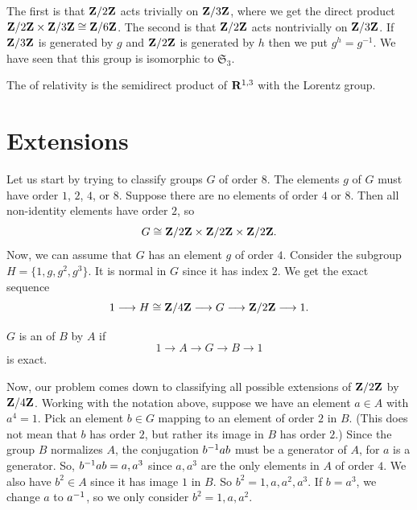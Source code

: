 \documentclass[11pt, twoside]{amsart}
\begin{document}
The first is that $\mathbf{Z}/2\mathbf{Z}$ acts trivially on $\mathbf{Z}/3\mathbf{Z}$, where we get the direct product \newline$\mathbf{Z}/2\mathbf{Z}\times \mathbf{Z}/3\mathbf{Z}\cong \mathbf{Z}/6\mathbf{Z}$. The second is that $\mathbf{Z}/2\mathbf{Z}$ acts nontrivially on $\mathbf{Z}/3\mathbf{Z}$. If $\mathbf{Z}/3\mathbf{Z}$ is generated by $g$ and $\mathbf{Z}/2\mathbf{Z}$ is generated by $h$ then we put $g^h = g^{-1}$. We have seen that this group is isomorphic to $\mathfrak{S}_3$.

\begin{example}
The  of relativity is the semidirect product of $\mathbf R^{1,3}$ with the {Lorentz group}.
\end{example}

\section{Extensions}
Let us start by trying to classify groups $G$ of order $8$. The elements $g$ of $G$ must have order $1$, $2$, $4$, or $8$. Suppose there are no elements of order $4$ or $8$. Then all non-identity elements have order $2$, so 
$$
G \cong \mathbf{Z}/2\mathbf{Z} \times \mathbf{Z}/2\mathbf{Z} \times \mathbf{Z}/2\mathbf{Z}.
$$ 
Now, we can assume that $G$ has an element $g$ of order $4$. Consider the subgroup $H = \{ 1,g,g^2, g^3\}$. It is normal in $G$ since it has index $2$. We get the exact sequence
$$
1\longrightarrow H\cong \mathbf{Z}/4\mathbf{Z} \longrightarrow G\longrightarrow \mathbf{Z}/2\mathbf{Z} \longrightarrow 1.
$$

\begin{definition}
$G$ is an  of $B$ by $A$ if
$$
1\longrightarrow A \longrightarrow G \longrightarrow B \longrightarrow 1
$$
is exact.
\end{definition}

Now, our problem comes down to classifying all possible extensions of $\mathbf{Z}/2\mathbf{Z} $ by $\mathbf{Z}/4\mathbf{Z} $. Working with the notation above, suppose we have an element $a\in A$ with $a^4 =1$. Pick an element $b\in G$ mapping to an element of order $2$ in $B$. (This does not mean that $b$ has order $2$, but rather its image in $B$ has order $2$.) Since the group $B$ {normalizes} $A$, the conjugation $b^{-1} ab $ must be a generator of $A$, for $a$ is a generator. So, $b^{-1} ab =a,a^3$ since $a,a^3$ are the only elements in $A$ of order $4$. We also have $b^2\in A$ since it has image $1$ in $B$. So $b^2=1,a,a^2,a^3$. If $b=a^3$, we change $a$ to $a^{-1}$, so we only consider $b^2 = 1,a,a^2$.
\end{document}
